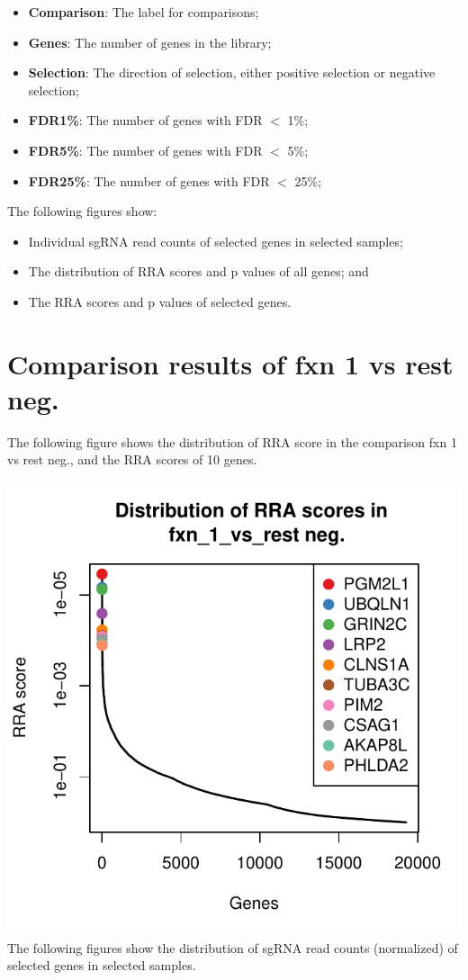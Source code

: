 \documentclass{article}
\begin{document}
\begin{itemize}
\item \textbf{Comparison}: The label for comparisons;
\item \textbf{Genes}: The number of genes in the library;
\item \textbf{Selection}: The direction of selection, either positive selection or negative selection;
\item \textbf{FDR1\%}: The number of genes with FDR $<$ 1\%;
\item \textbf{FDR5\%}: The number of genes with FDR $<$ 5\%;
\item \textbf{FDR25\%}: The number of genes with FDR $<$ 25\%;
\end{itemize}

The following figures show:

\begin{itemize}
\item Individual sgRNA read counts of selected genes in selected samples; 
\item The distribution of RRA scores and p values of all genes; and
\item The RRA scores and p values of selected genes.
\end{itemize}


\newpage\section{Comparison results of fxn 1 vs rest neg.}

The following figure shows the distribution of RRA score in the comparison fxn 1 vs rest neg., and the RRA scores of 10 genes.

%


\includegraphics{defaultTest_defaultNormCount_screen1_summary-004}
\clearpage
\newpage
The following figures show the distribution of sgRNA read counts (normalized) of selected genes in selected samples.
%
\end{document}
